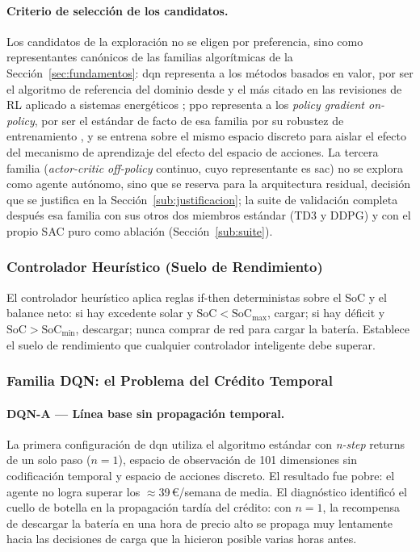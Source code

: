 \documentclass[12pt, a4paper, twoside]{report}
\begin{document}
\paragraph{Criterio de selección de los candidatos.} Los candidatos de la
exploración no se eligen por preferencia, sino como representantes canónicos de
las familias algorítmicas de la Sección~\ref{sec:fundamentos}: \acrshort{dqn}
representa a los métodos basados en valor, por ser el algoritmo de referencia
del dominio desde \citet{Mnih2015} y el más citado en las revisiones de RL
aplicado a sistemas energéticos \citep{Perera2021, Vazquez2019};
\acrshort{ppo} representa a los \textit{policy gradient on-policy}, por ser el
estándar de facto de esa familia por su robustez de entrenamiento
\citep{Schulman2017}, y se entrena sobre el mismo espacio discreto para aislar
el efecto del mecanismo de aprendizaje del efecto del espacio de acciones. La
tercera familia (\textit{actor-critic off-policy} continuo, cuyo representante
es \acrshort{sac}) no se explora como agente autónomo, sino que se reserva
para la arquitectura residual, decisión que se justifica en la
Sección~\ref{sub:justificacion}; la suite de validación completa después esa
familia con sus otros dos miembros estándar (TD3 y DDPG) y con el propio SAC
puro como ablación (Sección~\ref{sub:suite}).

\subsubsection{Controlador Heurístico (Suelo de Rendimiento)}

El controlador heurístico aplica reglas if-then deterministas sobre el SoC y
el balance neto: si hay excedente solar y $\text{SoC} < \text{SoC}_{\max}$,
cargar; si hay déficit y $\text{SoC} > \text{SoC}_{\min}$, descargar; nunca
comprar de red para cargar la batería. Establece el suelo de rendimiento que
cualquier controlador inteligente debe superar.

\subsubsection{Familia DQN: el Problema del Crédito Temporal}

\paragraph{DQN-A — Línea base sin propagación temporal.}
La primera configuración de \acrshort{dqn} utiliza el algoritmo estándar con
\textit{n-step} returns de un solo paso ($n=1$), espacio de observación de
101 dimensiones sin codificación temporal y espacio de acciones discreto. El
resultado fue pobre: el agente no logra superar los $\approx$39\,€/semana de
media. El diagnóstico identificó el cuello de botella en la propagación tardía
del crédito: con $n=1$, la recompensa de descargar la batería en una hora de
precio alto se propaga muy lentamente hacia las decisiones de carga que la
hicieron posible varias horas antes.
\end{document}
